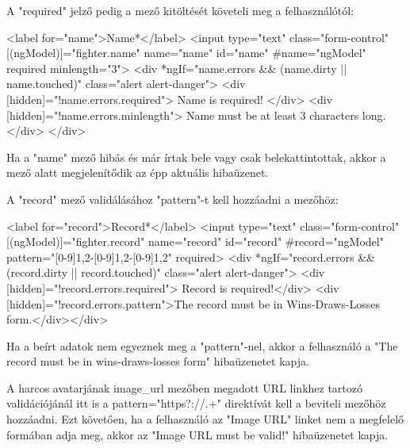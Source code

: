 A "required" jelző pedig a mező kitöltését követeli meg a felhasználótól:

\begin{cpp}
<label for="name">Name*</label>
<input type="text" class="form-control" [(ngModel)]="fighter.name" 
name="name" id="name" #name="ngModel" required minlength="3">
<div *ngIf="name.errors && (name.dirty || name.touched)" 
	class="alert alert-danger">
	<div [hidden]="!name.errors.required">
    	Name is required!
    </div>
    <div [hidden]="!name.errors.minlength">
    	Name must be at least 3 characters long.
    </div>
</div>
\end{cpp}

Ha a "name" mező hibás és már írtak bele vagy csak belekattintottak, akkor a mező alatt megjelenítődik az épp aktuális hibaüzenet.

A "record" mező validálásához "pattern"-t kell hozzáadni a mezőhöz:

\begin{cpp}
<label for="record">Record*</label>
<input type="text" class="form-control" [(ngModel)]="fighter.record" 
name="record" id="record" #record="ngModel" 
pattern="[0-9]{1,2}-[0-9]{1,2}-[0-9]{1,2}" required>
<div *ngIf="record.errors && (record.dirty || record.touched)" 
class="alert alert-danger">
<div [hidden]="!record.errors.required">
	Record is required!</div>
<div [hidden]="!record.errors.pattern">The record must be in 
Wins-Draws-Losses form.</div></div>
\end{cpp}

Ha a beírt adatok nem egyeznek meg a "pattern"-nel, akkor a felhasználó a "The record must be in wins-draws-losses form" hibaüzenetet kapja.

A harcos avatarjának image\_url mezőben megadott URL linkhez tartozó validációjánál itt is a pattern="https?://.+" direktívát kell a beviteli mezőhöz hozzáadni. Ezt követően, ha a felhasználó az "Image URL" linket nem a megfelelő formában adja meg, akkor az "Image URL must be valid!" hibaüzenetet kapja.
\newpage


